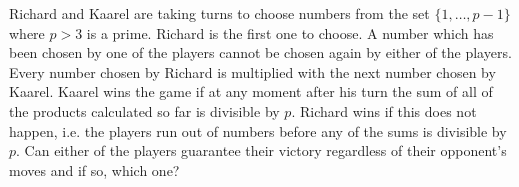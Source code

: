 Richard and Kaarel are taking turns to choose numbers from the
set $\{1,\dots,p-1\}$ where $p > 3$ is a prime. Richard is the first one to
choose. A number which has been chosen by one of the players cannot
be chosen again by either of the players. Every number chosen by Richard is multiplied
with the next number chosen by Kaarel. Kaarel wins the game if at any moment after his turn the sum of all of the products calculated so far is divisible by $p$.
Richard wins if this does not happen, i.e. the players run out of numbers before
any of the sums is divisible by $p$. Can either of the players guarantee their
victory regardless of their opponent's moves and if so, which one?